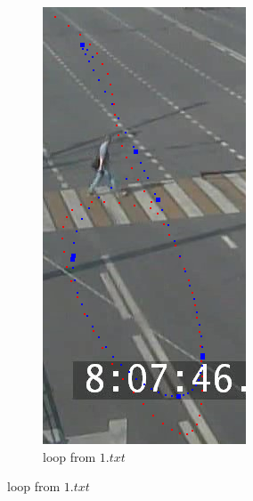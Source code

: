 \begin{figure}[!htb]
\begin{subfigure}[!htb]{0.3\textwidth}
		\includegraphics[width=\textwidth]{images/regr_kp_loop.png}
		\caption{loop from $1.txt$}

\end{subfigure}
\end{figure}
